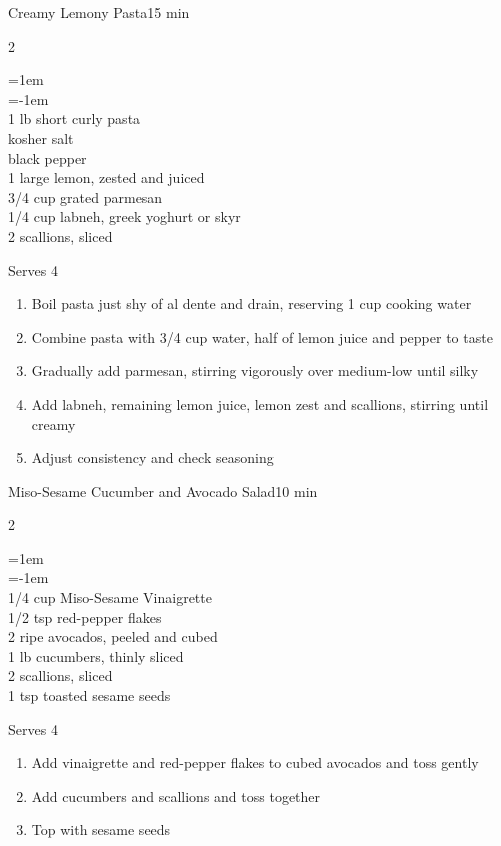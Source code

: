 \documentclass{article}
\newenvironment{recipe}[3][]
    {\begin{cardbase}[#1]{#2}{#3}
    \columnratio{0.333}
    \begin{paracol}{2}}
    {\end{paracol}\end{cardbase}}
\newenvironment{denserecipe}[3][]
    {\small
    \begin{recipe}[#1]{#2}{#3}}
    {\end{recipe}}
\newcommand{\nextcolumn}{\switchcolumn}
\newenvironment{ingredients}
    {
    \begin{obeylines}
    \vspace{\parskip}
    \setlength{\parskip}{0.25em}
    \vspace{-0.25em}
    \leftskip=1em
    \parindent=-1em}
    {\end{obeylines}}
\newenvironment{steps}
    {\begin{enumerate}[leftmargin=*,topsep=0pt]}
    {\end{enumerate}}
\newcommand{\tag}[1]{\hspace{1em}#1}
\newcommand{\symboltag}[2]{\tag{#1\hspace{0.4em}#2}}
\newcommand{\totaltime}[1]{\symboltag{\raisebox{-0.1em}{\small\StopWatchEnd}}{#1}}
\begin{document}
\begin{recipe}{Creamy Lemony Pasta}{\totaltime{15 min}}
\begin{ingredients}
1 lb short curly pasta
kosher salt
black pepper
1 large lemon, zested and juiced
3/4 cup grated parmesan
1/4 cup labneh, greek yoghurt or skyr
2 scallions, sliced
\end{ingredients}
\nextcolumn
Serves 4
\begin{steps}
\item Boil pasta just shy of al dente and drain, reserving 1 cup cooking water
\item Combine pasta with 3/4 cup water, half of lemon juice and pepper to taste
\item Gradually add parmesan, stirring vigorously over medium-low until silky
\item Add labneh, remaining lemon juice, lemon zest and scallions, stirring until creamy
\item Adjust consistency and check seasoning
\end{steps}
\end{recipe}

\begin{denserecipe}{Miso-Sesame Cucumber and Avocado Salad}{\totaltime{10 min}}
\begin{ingredients}
1/4 cup Miso-Sesame Vinaigrette
1/2 tsp red-pepper flakes
2 ripe avocados, peeled and cubed
1 lb cucumbers, thinly sliced
2 scallions, sliced
1 tsp toasted sesame seeds
\end{ingredients}
\nextcolumn
Serves 4
\begin{steps}
\item Add vinaigrette and red-pepper flakes to cubed avocados and toss gently
\item Add cucumbers and scallions and toss together
\item Top with sesame seeds
\end{steps}
\end{denserecipe}
\end{document}

